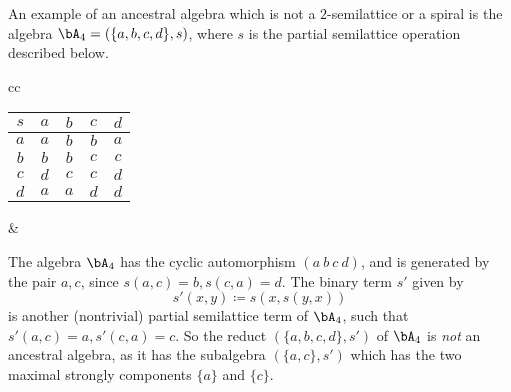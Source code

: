 \begin{ex}\label{ex-ancestral-strong} An example of an ancestral algebra which is not a $2$-semilattice or a spiral is the algebra $\bA_4 = (\{a,b,c,d\},s)$, where $s$ is the partial semilattice operation described below.
\begin{center}
\begin{tabular}{cc}%
\begin{tabular}{c|cccc} $s$ & $a$ & $b$ & $c$ & $d$\\ \hline $a$ & $a$ & $b$ & $b$ & $a$\\ $b$ & $b$ & $b$ & $c$ & $c$\\ $c$ & $d$ & $c$ & $c$ & $d$\\ $d$ & $a$ & $a$ & $d$ & $d$\end{tabular} & 
\end{tabular}
\end{center}
The algebra $\bA_4$ has the cyclic automorphism $(a\ b\ c\ d)$, and is generated by the pair $a,c$, since $s(a,c) = b, s(c,a) = d$. The binary term $s'$ given by
\[
s'(x,y) \coloneqq s(x,s(y,x))
\]
is another (nontrivial) partial semilattice term of $\bA_4$, such that $s'(a,c) = a, s'(c,a) = c$. So the reduct $(\{a,b,c,d\},s')$ of $\bA_4$ is \emph{not} an ancestral algebra, as it has the subalgebra $(\{a,c\},s')$ which has the two maximal strongly components $\{a\}$ and $\{c\}$.


\end{ex}
